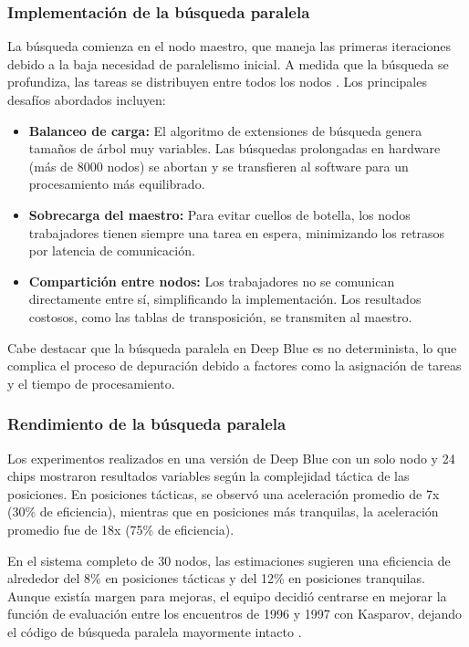 \documentclass[12pt,a4paper]{article}
\begin{document}
\subsubsection*{Implementación de la búsqueda paralela}
La búsqueda comienza en el nodo maestro, que maneja las primeras iteraciones debido a la baja necesidad de paralelismo inicial. A medida que la búsqueda se profundiza, las tareas se distribuyen entre todos los nodos \cite{campbell2002deepblue}. Los principales desafíos abordados incluyen:
\begin{itemize}
    \item \textbf{Balanceo de carga:} El algoritmo de extensiones de búsqueda genera tamaños de árbol muy variables. Las búsquedas prolongadas en hardware (más de 8000 nodos) se abortan y se transfieren al software para un procesamiento más equilibrado.
    \item \textbf{Sobrecarga del maestro:} Para evitar cuellos de botella, los nodos trabajadores tienen siempre una tarea en espera, minimizando los retrasos por latencia de comunicación.
    \item \textbf{Compartición entre nodos:} Los trabajadores no se comunican directamente entre sí, simplificando la implementación. Los resultados costosos, como las tablas de transposición, se transmiten al maestro.
\end{itemize}

Cabe destacar que la búsqueda paralela en Deep Blue es no determinista, lo que complica el proceso de depuración debido a factores como la asignación de tareas y el tiempo de procesamiento.

\subsubsection*{Rendimiento de la búsqueda paralela}
Los experimentos realizados en una versión de Deep Blue con un solo nodo y 24 chips mostraron resultados variables según la complejidad táctica de las posiciones. En posiciones tácticas, se observó una aceleración promedio de 7x (30\% de eficiencia), mientras que en posiciones más tranquilas, la aceleración promedio fue de 18x (75\% de eficiencia).

En el sistema completo de 30 nodos, las estimaciones sugieren una eficiencia de alrededor del 8\% en posiciones tácticas y del 12\% en posiciones tranquilas. Aunque existía margen para mejoras, el equipo decidió centrarse en mejorar la función de evaluación entre los encuentros de 1996 y 1997 con Kasparov, dejando el código de búsqueda paralela mayormente intacto \cite{campbell2002deepblue}.
\end{document}
